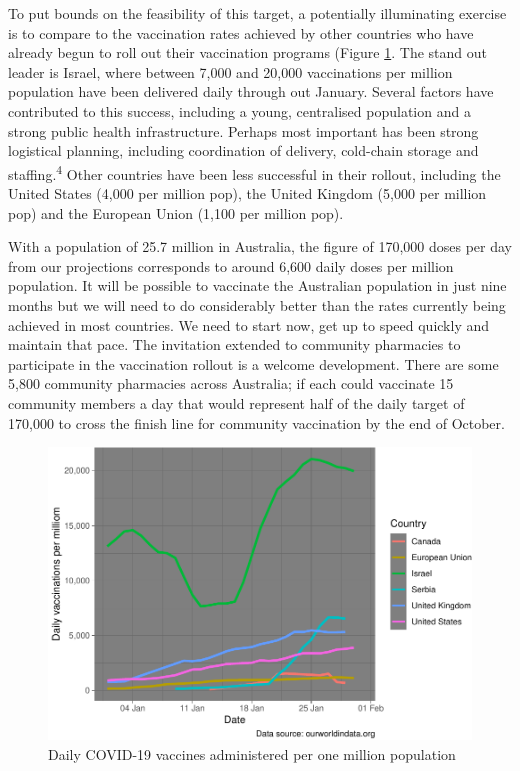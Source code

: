 \documentclass{article}
\begin{document}
To put bounds on the feasibility of this target, a potentially
illuminating exercise is to compare to the vaccination rates achieved by
other countries who have already begun to roll out their vaccination
programs (Figure \ref{fig:dailyVac}. The stand out leader is Israel,
where between 7,000 and 20,000 vaccinations per million population have
been delivered daily through out January. Several factors have
contributed to this success, including a young, centralised population
and a strong public health infrastructure. Perhaps most important has
been strong logistical planning, including coordination of delivery,
cold-chain storage and staffing.\textsuperscript{4} Other countries have
been less successful in their rollout, including the United States
(4,000 per million pop), the United Kingdom (5,000 per million pop) and
the European Union (1,100 per million pop).

With a population of 25.7 million in Australia, the figure of 170,000
doses per day from our projections corresponds to around 6,600 daily
doses per million population. It will be possible to vaccinate the
Australian population in just nine months but we will need to do
considerably better than the rates currently being achieved in most
countries. We need to start now, get up to speed quickly and maintain
that pace. The invitation extended to community pharmacies to
participate in the vaccination rollout is a welcome development. There
are some 5,800 community pharmacies across Australia; if each could
vaccinate 15 community members a day that would represent half of the
daily target of 170,000 to cross the finish line for community
vaccination by the end of October.

\begin{figure}

{\centering \includegraphics{researchNote_files/figure-latex/dailyVac-1} 

}

\caption{Daily COVID-19 vaccines administered per one million population}\label{fig:dailyVac}
\end{figure}
\end{document}
